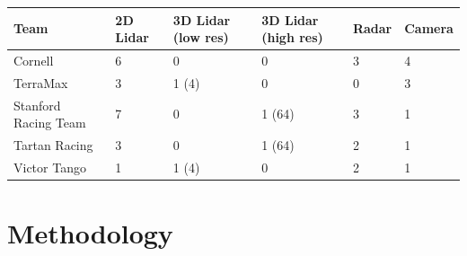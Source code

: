 \documentclass[11pt,oneside,openright]{mpreport}
\begin{document}
\begin{tabularx}{\textwidth}{|X|X|X|X|X|X|}
\hline \textbf{Team} & \textbf{2D Lidar} & \textbf{3D Lidar (low res)} & \textbf{3D Lidar (high res)} & \textbf{Radar} & \textbf{Camera}\\\hline
Cornell \cite{Campbell2007} & 6 & 0 & 0 & 3 & 4 \\\hline
TerraMax \cite{Corp2005} & 3 & 1 (4) & 0 & 0 & 3  \\\hline
Stanford Racing Team \cite{Montemerlo2009} & 7 & 0 & 1 (64) & 3 & 1 \\\hline
Tartan Racing \cite{Urmson2007} & 3 & 0 & 1 (64) & 2 & 1  \\\hline
Victor Tango \cite{Atreya2007} & 1 & 1 (4) & 0 & 2 & 1  \\\hline
\end{tabularx}

\chapter{Methodology}




\end{document}
